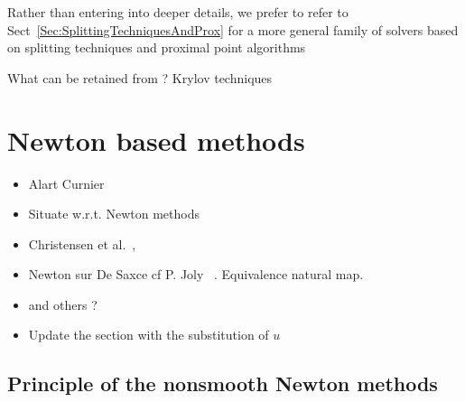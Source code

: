  Rather than entering into deeper details, we prefer to refer to Sect~\ref{Sec:SplittingTechniquesAndProx} for a more general family of solvers based on splitting techniques and proximal point algorithms 


 \begin{ndrva}
   What can be retained from\cite{Heyn_PhD2013} ? Krylov techniques
 \end{ndrva}


\clearpage
\section{Newton based methods}
\label{sec:newtonmethods}

\begin{itemize}
\item Alart Curnier~\cite{Alart.Curnier1991}
\item Situate \cite{Simo.Laursen1992} w.r.t. Newton methods
\item Christensen et al.\cite{Christensen.Klarbring.ea1998}~\cite{Christensen.Pang1998},
\item Newton sur De Saxce cf P. Joly~\cite{Joli.Feng2008} . Equivalence natural map.
\item and others ?~\cite{Stadler_SIOPT2004}~\cite{Hueber.ea_SJSC2008,Hueber.Wolhmuth_CMAME2005}\cite{Koziara.Bicanic_CMAME2008}\cite{Renard_CMAME2013}
\item Update the section with the substitution of $u$
\end{itemize}

\subsection{Principle of the nonsmooth Newton methods}


